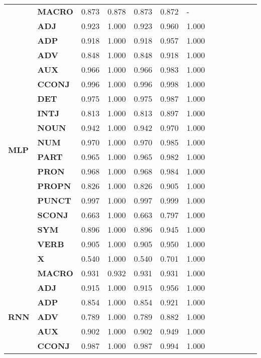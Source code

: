 \begin{longtable}{|l||l||l||l||l||l||l||l||l||l||l||l||l|}
\textbf{} & \textbf{MACRO} & 0.873 & 0.878 & 0.873 & 0.872 & - \\
\cline{1-7}
\multirow[t]{18}{*}{\textbf{MLP}} & \textbf{ADJ} & 0.923 & 1.000 & 0.923 & 0.960 & 1.000 \\
\textbf{} & \textbf{ADP} & 0.918 & 1.000 & 0.918 & 0.957 & 1.000 \\
\textbf{} & \textbf{ADV} & 0.848 & 1.000 & 0.848 & 0.918 & 1.000 \\
\textbf{} & \textbf{AUX} & 0.966 & 1.000 & 0.966 & 0.983 & 1.000 \\
\textbf{} & \textbf{CCONJ} & 0.996 & 1.000 & 0.996 & 0.998 & 1.000 \\
\textbf{} & \textbf{DET} & 0.975 & 1.000 & 0.975 & 0.987 & 1.000 \\
\textbf{} & \textbf{INTJ} & 0.813 & 1.000 & 0.813 & 0.897 & 1.000 \\
\textbf{} & \textbf{NOUN} & 0.942 & 1.000 & 0.942 & 0.970 & 1.000 \\
\textbf{} & \textbf{NUM} & 0.970 & 1.000 & 0.970 & 0.985 & 1.000 \\
\textbf{} & \textbf{PART} & 0.965 & 1.000 & 0.965 & 0.982 & 1.000 \\
\textbf{} & \textbf{PRON} & 0.968 & 1.000 & 0.968 & 0.984 & 1.000 \\
\textbf{} & \textbf{PROPN} & 0.826 & 1.000 & 0.826 & 0.905 & 1.000 \\
\textbf{} & \textbf{PUNCT} & 0.997 & 1.000 & 0.997 & 0.999 & 1.000 \\
\textbf{} & \textbf{SCONJ} & 0.663 & 1.000 & 0.663 & 0.797 & 1.000 \\
\textbf{} & \textbf{SYM} & 0.896 & 1.000 & 0.896 & 0.945 & 1.000 \\
\textbf{} & \textbf{VERB} & 0.905 & 1.000 & 0.905 & 0.950 & 1.000 \\
\textbf{} & \textbf{X} & 0.540 & 1.000 & 0.540 & 0.701 & 1.000 \\
\textbf{} & \textbf{MACRO} & 0.931 & 0.932 & 0.931 & 0.931 & 1.000 \\
\cline{1-7}
\multirow[t]{18}{*}{\textbf{RNN}} & \textbf{ADJ} & 0.915 & 1.000 & 0.915 & 0.956 & 1.000 \\
\textbf{} & \textbf{ADP} & 0.854 & 1.000 & 0.854 & 0.921 & 1.000 \\
\textbf{} & \textbf{ADV} & 0.789 & 1.000 & 0.789 & 0.882 & 1.000 \\
\textbf{} & \textbf{AUX} & 0.902 & 1.000 & 0.902 & 0.949 & 1.000 \\
\textbf{} & \textbf{CCONJ} & 0.987 & 1.000 & 0.987 & 0.994 & 1.000 \\

\end{longtable}
